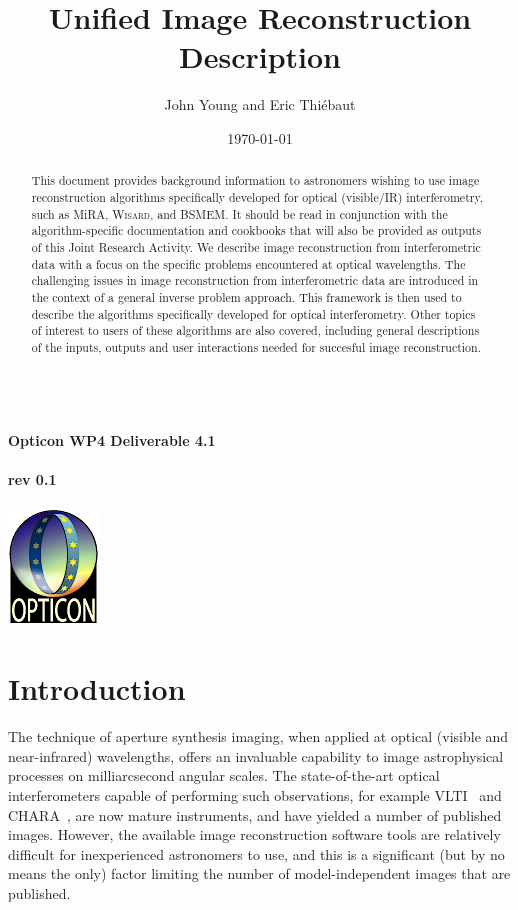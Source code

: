 \documentclass{article}
\newcommand{\identifier}[1]{\def\theidentifier{#1}}
\newcommand{\revision}[1]{\def\therevision{#1}}
\newcommand{\opttitlepage}{
\begin{titlepage}
\thispagestyle{plain}
\begin{center}
%
\vspace*{18mm}
{\bfseries\sffamily
  \Large\thetitle \\
  \vspace{6mm}
  \large\theidentifier \\ }
%
\vspace{17mm}
{\large\bfseries\sffamily \theauthor \\ }
%
\vspace{24mm}
{\large\bfseries\sffamily
  rev \therevision \\
  \vspace{6mm}
  \thedate \\ }
%
\vspace{36mm}
\includegraphics{opt_col_sm} \\
%
\end{center}
\end{titlepage}
}
\newcommand{\Mira}{MiRA\xspace}
\newcommand{\BSMEM}{BSMEM\xspace}
\newcommand{\Wisard}{\textsc{Wisard}\xspace}
\begin{document}
\title{Unified Image Reconstruction Description}

\author{John Young and Eric Thi\'ebaut}


\identifier{Opticon WP4 Deliverable 4.1}
\revision{0.1}
\date{\today}

\opttitlepage

\begin{abstract}
  This document provides background information to astronomers
  wishing to use image reconstruction algorithms specifically developed for
  optical (visible/IR) interferometry, such as \Mira, \Wisard, and \BSMEM. It
  should be read in conjunction with the algorithm-specific documentation and
  cookbooks that will also be provided as outputs of this Joint Research
  Activity. We describe image reconstruction from interferometric data with a
  focus on the specific problems encountered at optical wavelengths.  The
  challenging issues in image reconstruction from interferometric data are
  introduced in the context of a general inverse problem approach.  This
  framework is then used to describe the algorithms specifically developed for
  optical interferometry. Other topics of interest to users of these
  algorithms are also covered, including general descriptions of the inputs,
  outputs and user interactions needed for succesful image reconstruction.
\end{abstract}

\section{Introduction}

The technique of aperture synthesis imaging, when applied at optical (visible
and near-infrared) wavelengths, offers an invaluable capability to image
astrophysical processes on milliarcsecond angular scales. The state-of-the-art
optical interferometers capable of performing such observations, for example
VLTI~\citep{Glindemann_et_al-2000-VLTI} and
CHARA~\citep{tenBrummelaar_et_al-2005-CHARA}, are now mature instruments, and
have yielded a number of published images. However, the available image
reconstruction software tools are relatively difficult for inexperienced
astronomers to use, and this is a significant (but by no means the only)
factor limiting the number of model-independent images that are published.
\end{document}
